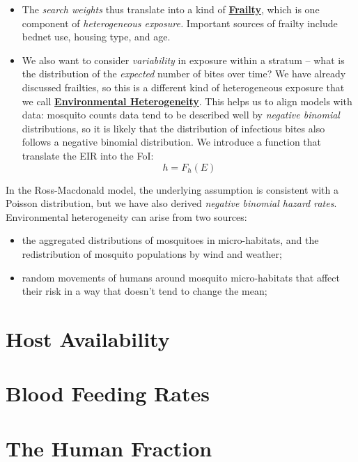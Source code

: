 \documentclass[
]{book}
\begin{document}
\begin{itemize}
\item
  The \emph{search weights} thus translate into a kind of \textbf{\hyperref[frailtyCh]{Frailty}}, which is one component of \emph{heterogeneous exposure.} Important sources of frailty include bednet use, housing type, and age.
\item
  We also want to consider \emph{variability} in exposure within a stratum -- what is the distribution of the \emph{expected} number of bites over time? We have already discussed frailties, so this is a different kind of heterogeneous exposure that we call \textbf{\hyperref[environmental-heterogeneity]{Environmental Heterogeneity}}. This helps us to align models with data: mosquito counts data tend to be described well by \emph{negative binomial} distributions, so it is likely that the distribution of infectious bites also follows a negative binomial distribution. We introduce a function that translate the EIR into the FoI:
  \[h=F_h(E)\]
\end{itemize}

In the Ross-Macdonald model, the underlying assumption is consistent with a Poisson distribution, but we have also derived \emph{negative binomial hazard rates}. Environmental heterogeneity can arise from two sources:

\begin{itemize}
\item
  the aggregated distributions of mosquitoes in micro-habitats, and the redistribution of mosquito populations by wind and weather;
\item
  random movements of humans around mosquito micro-habitats that affect their risk in a way that doesn't tend to change the mean;
\end{itemize}

\section{Host Availability}\label{host-availability}

\section{Blood Feeding Rates}\label{blood-feeding-rates}

\section{The Human Fraction}\label{the-human-fraction}
\end{document}
